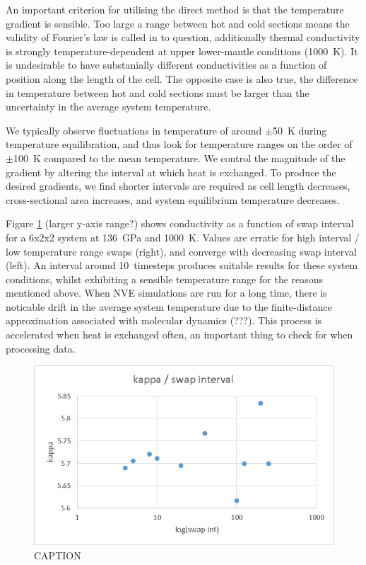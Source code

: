 \documentclass[%
preprint,                                  %
nofootinbib,
 amsmath,amssymb,
 aps,
]{revtex4-1}
\begin{document}
An important criterion for utilising the direct method is that the temperature gradient is sensible. Too large a range between hot and cold sections means the validity of Fourier's law is called in to question, additionally thermal conductivity is strongly temperature-dependent at upper lower-mantle conditions (1000~K). It is undesirable to have substanially different conductivities as a function of position along the length of the cell. The opposite case is also true, the difference in temperature between hot and cold sections must be larger than the uncertainty in the average system temperature. 

We typically observe fluctuations in temperature of around $\pm$50~K during temperature equilibration, and thus look for temperature ranges on the order of $\pm$100~K compared to the mean temperature. We control the magnitude of the gradient by altering the interval at which heat is exchanged. To produce the desired gradients, we find shorter intervals are required as cell length decreases, cross-sectional area increases, and system equilibrium temperature decreases. 

Figure \ref{fig:swap_int} (larger y-axis range?) shows conductivity as a function of swap interval for a 6x2x2 system at 136~GPa and 1000~K. Values are erratic for high interval / low temperature range swaps (right), and converge with decreasing swap interval (left). An interval around 10~timesteps produces suitable results for these system conditions, whilst exhibiting a sensible temperature range for the reasons mentioned above. When NVE simulations are run for a long time, there is noticable drift in the average system temperature due to the finite-distance approximation associated with molecular dynamics (???). This process is accelerated when heat is exchanged often, an important thing to check for when processing data.

\begin{figure}[h!]
  \includegraphics[width=\linewidth]{images/swap_int.png}
  \caption{CAPTION}
  \label{fig:swap_int}
\end{figure}
\end{document}
